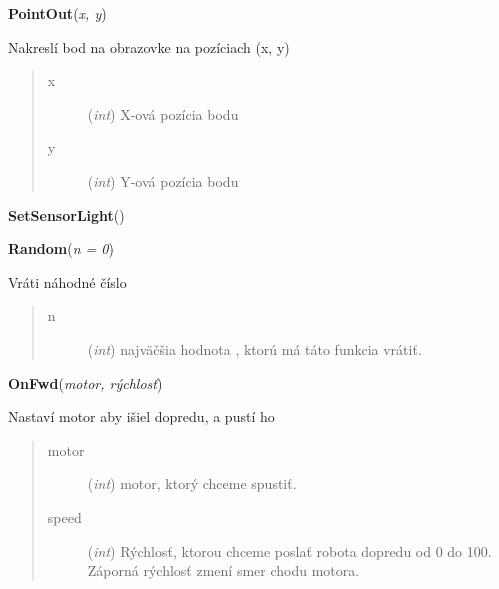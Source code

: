 \documentclass[10pt,a4paper]{article}
\begin{document}
 

\vspace{6pt}
{\bf PointOut}({\it x, y}) 
    
    Nakreslí bod na obrazovke na pozíciach (x, y)



    

\begin{quote}
    \begin{description}
        
\item[x] ({\emph{int}}) X-ová pozícia bodu

\item[y] ({\emph{int}}) Y-ová pozícia bodu

    \end{description}
\end{quote}

 

\vspace{6pt}
{\bf SetSensorLight}({\it }) 

 

\vspace{6pt}
{\bf Random}({\it n = 0}) 
    
    Vráti náhodné číslo
    

    

\begin{quote}
    \begin{description}
        
\item[n] ({\emph{int}}) najväčšia hodnota , ktorú má táto funkcia vrátiť. 

    \end{description}
\end{quote}

 

\vspace{6pt}
{\bf OnFwd}({\it motor, rýchlosť}) 
  
    Nastaví motor aby išiel dopredu, a pustí ho
    


    

\begin{quote}
    \begin{description}
        
\item[motor] ({\emph{int}}) motor, ktorý chceme spustiť.

\item[speed] ({\emph{int}}) Rýchlosť, ktorou chceme poslať robota dopredu od 0 do 100. Záporná rýchlosť zmení smer chodu motora.   

    \end{description}
\end{quote}
\end{document}
